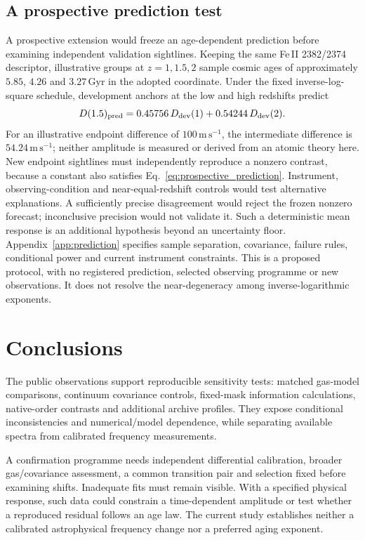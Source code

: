 \subsection{A prospective prediction test}
\label{sec:prospective}
A prospective extension would freeze an age-dependent prediction before examining independent validation sightlines. Keeping the same Fe\,II 2382/2374 descriptor, illustrative groups at $z=1,1.5,2$ sample cosmic ages of approximately $5.85$, $4.26$ and $3.27\,\mathrm{Gyr}$ in the adopted coordinate. Under the fixed inverse-log-square schedule, development anchors at the low and high redshifts predict
\begin{equation}
 D(1.5)_{\rm pred}=0.45756\,D_{\rm dev}(1)
                   +0.54244\,D_{\rm dev}(2).
 \label{eq:prospective_prediction}
\end{equation}
For an illustrative endpoint difference of $100\,\mathrm{m\,s^{-1}}$, the intermediate difference is $54.24\,\mathrm{m\,s^{-1}}$; neither amplitude is measured or derived from an atomic theory here. New endpoint sightlines must independently reproduce a nonzero contrast, because a constant also satisfies Eq.~\ref{eq:prospective_prediction}. Instrument, observing-condition and near-equal-redshift controls would test alternative explanations. A sufficiently precise disagreement would reject the frozen nonzero forecast; inconclusive precision would not validate it. Such a deterministic mean response is an additional hypothesis beyond an uncertainty floor. Appendix~\ref{app:prediction} specifies sample separation, covariance, failure rules, conditional power and current instrument constraints. This is a proposed protocol, with no registered prediction, selected observing programme or new observations. It does not resolve the near-degeneracy among inverse-logarithmic exponents.

\section{Conclusions}
\label{sec:conclusions}
The public observations support reproducible sensitivity tests: matched gas-model comparisons, continuum covariance controls, fixed-mask information calculations, native-order contrasts and additional archive profiles. They expose conditional inconsistencies and numerical/model dependence, while separating available spectra from calibrated frequency measurements.

A confirmation programme needs independent differential calibration, broader gas/covariance assessment, a common transition pair and selection fixed before examining shifts. Inadequate fits must remain visible. With a specified physical response, such data could constrain a time-dependent amplitude or test whether a reproduced residual follows an age law. The current study establishes neither a calibrated astrophysical frequency change nor a preferred aging exponent.
